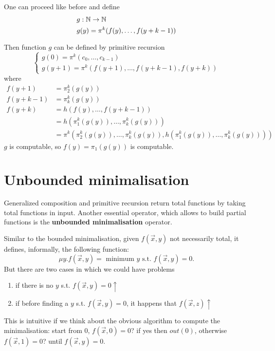 One can proceed like before and define
\begin{align*}
  & g:\mathbb{N}\rightarrow\mathbb{N} \\
  & g(y) = \pi^k(f(y),\dots,f(y+k-1))
\end{align*}

Then function $g$ can be defined by primitive recursion
\[
\begin{cases}
  g(0) = \pi^k(c_0,\dots,c_{k-1})\\
  g(y+1) = \pi^k(f(y+1),\dots,f(y+k-1),f(y+k))
\end{cases}  
\]
where
  \begin{align*}
     f(y+1) & = \pi_2^k(g(y))\\
     f(y+k-1) & = \pi_k^k(g(y))\\
     f(y+k) & = h(f(y),\dots,f(y+k-1)) \\
            & = h(\pi_1^k(g(y)),\dots,\pi_k^k(g(y)))\\
            & = \pi^k(\pi_2^k(g(y)),\dots,\pi_k^k(g(y)),h(\pi_1^k(g(y)),\dots,\pi_k^k(g(y))))
   \end{align*}
 $g$ is computable, so $f(y) = \pi_1(g(y))$ is computable.

\section{Unbounded minimalisation}
Generalized composition and primitive recursion return total functions by taking total functions in input. 
Another essential operator, which allows to build partial functions is the \textbf{unbounded minimalisation} operator.

Similar to the bounded minimalisation, given $f(\vec{x},y)$ not necessarily total, it defines, informally, the following function:
\[
  \mu y . f(\vec{x},y)  = \mbox{ minimum } y \mbox{ s.t. } f(\vec{x},y) = 0.
\]
But there are two cases in which we could have problems
\begin{enumerate}
\item if there is no $y$ s.t. $f(\vec{x},y) = 0 \uparrow$
\item if before finding a $y$ s.t. $f(\vec{x},y) = 0$, it happens that $f(\vec{x},z)\uparrow$
\end{enumerate}
This is intuitive if we think about the obvious algorithm to compute the minimalisation: start from 0, $f(\vec{x},0) = 0$? if yes then $out(0)$, otherwise $f(\vec{x},1) = 0$? until $f(\vec{x},y) = 0$.

